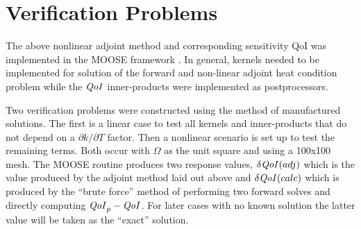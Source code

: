 \documentclass{article}
\newcommand{\bra}{\left\langle}
\newcommand{\ket}{\right\rangle}
\renewcommand{\div}{\vec{\nabla} \cdot}
\newcommand{\grad}{\vec{\nabla}}
\newcommand{\qoi}{{\it QoI}\xspace}
\begin{document}

\section{Verification Problems} The above nonlinear adjoint method and corresponding sensitivity QoI was implemented in the MOOSE framework \cite{MOOSE}. In general, kernels needed to be implemented for solution of the forward and non-linear adjoint heat condition problem while the $\qoi$ inner-products were implemented as postprocessors. 

Two verification problems were constructed using the method of manufactured solutions. The first is a linear case to test all kernels and inner-products that do not depend on a $\partial k / \partial T$ factor. Then a nonlinear scenario is set up to test the remaining terms. Both occur with $\Omega$ as the unit square and using a 100x100 mesh. The MOOSE routine produces two response values, $\delta \qoi({adj})$ which is the value produced by the adjoint method laid out above and $\delta \qoi({calc})$ which is produced by the ``brute force'' method of performing two forward solves and directly computing $\qoi_p - \qoi$. For later cases with no known solution the latter value will be taken as the ``exact'' solution.
\end{document}
